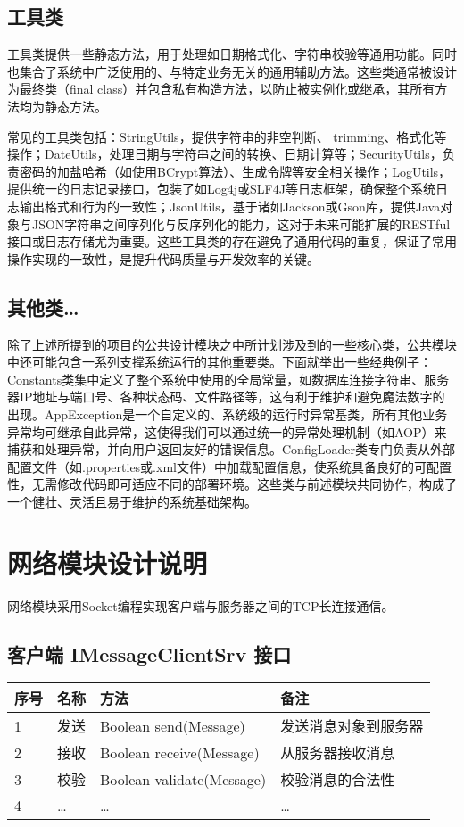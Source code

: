 \documentclass[a4paper]{ctexart}
\begin{document}
\subsection{工具类}
工具类提供一些静态方法，用于处理如日期格式化、字符串校验等通用功能。同时也集合了系统中广泛使用的、与特定业务无关的通用辅助方法。这些类通常被设计为最终类（final class）并包含私有构造方法，以防止被实例化或继承，其所有方法均为静态方法。

常见的工具类包括：StringUtils，提供字符串的非空判断、 trimming、格式化等操作；DateUtils，处理日期与字符串之间的转换、日期计算等；SecurityUtils，负责密码的加盐哈希（如使用BCrypt算法）、生成令牌等安全相关操作；LogUtils，提供统一的日志记录接口，包装了如Log4j或SLF4J等日志框架，确保整个系统日志输出格式和行为的一致性；JsonUtils，基于诸如Jackson或Gson库，提供Java对象与JSON字符串之间序列化与反序列化的能力，这对于未来可能扩展的RESTful接口或日志存储尤为重要。这些工具类的存在避免了通用代码的重复，保证了常用操作实现的一致性，是提升代码质量与开发效率的关键。
\subsection{其他类…}
除了上述所提到的项目的公共设计模块之中所计划涉及到的一些核心类，公共模块中还可能包含一系列支撑系统运行的其他重要类。下面就举出一些经典例子：Constants类集中定义了整个系统中使用的全局常量，如数据库连接字符串、服务器IP地址与端口号、各种状态码、文件路径等，这有利于维护和避免魔法数字的出现。AppException是一个自定义的、系统级的运行时异常基类，所有其他业务异常均可继承自此异常，这使得我们可以通过统一的异常处理机制（如AOP）来捕获和处理异常，并向用户返回友好的错误信息。ConfigLoader类专门负责从外部配置文件（如.properties或.xml文件）中加载配置信息，使系统具备良好的可配置性，无需修改代码即可适应不同的部署环境。这些类与前述模块共同协作，构成了一个健壮、灵活且易于维护的系统基础架构。

\section{网络模块设计说明}
网络模块采用Socket编程实现客户端与服务器之间的TCP长连接通信。

\subsection{客户端 IMessageClientSrv 接口}
\begin{tabular}{llll}
    \toprule
    \textbf{序号} & \textbf{名称} & \textbf{方法}               & \textbf{备注} \\
    \midrule
    1           & 发送          & Boolean send(Message)     & 发送消息对象到服务器  \\
    2           & 接收          & Boolean receive(Message)  & 从服务器接收消息    \\
    3           & 校验          & Boolean validate(Message) & 校验消息的合法性    \\
    4           & …           & …                         & …           \\
    \bottomrule
\end{tabular}
\end{document}
